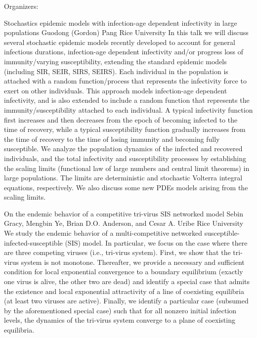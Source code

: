 \label{mini14}

\miniabs
{}
{Organizers: }
{}


\vspace{2ex}
\abs
{Stochastics epidemic models with infection-age dependent infectivity in large populations}
{Guodong (Gordon) Pang}
{Rice University}
{In this talk we will discuss several stochastic epidemic models recently developed to account for general infectious durations, infection-age dependent infectivity and/or progress loss of immunity/varying susceptibility, extending the standard epidemic models (including SIR, SEIR, SIRS, SEIRS). Each individual in the population is attached with a random function/process that represents the infectivity force to exert on other individuals. This approach models infection-age dependent infectivity, and is also extended to include a random function that represents the immunity/susceptibility attached to each individual. A typical infectivity function first increases and then decreases from the epoch of becoming infected to the time of recovery, while a typical susceptibility function gradually increases from the time of recovery to the time of losing immunity and becoming fully susceptible. We analyze the population dynamics of the infected and recovered individuals, and the total infectivity and susceptibility processes by establishing the scaling limits (functional law of large numbers and central limit theorems) in large populations. The limits are deterministic and stochastic Volterra integral equations, respectively. We also discuss some new PDEs models arising from the scaling limits.}


\vspace{1.5ex}
\abs
{On the endemic behavior of a competitive tri-virus SIS networked model}
{Sebin Gracy, Mengbin Ye, Brian D.O. Anderson, and Cesar A. Uribe}
{Rice University}
{We study the endemic behavior of a multi-competitive networked susceptible-infected-susceptible (SIS) model. In particular, we focus on the case where there are three competing viruses (i.e., tri-virus system). First, we show that the tri-virus system is not monotone. Thereafter, we provide a necessary and sufficient condition for local exponential convergence to a boundary equilibrium (exactly one virus is alive, the other two are dead) and identify a special case that admits the existence and local exponential attractivity of a line of coexisting equilibria (at least two viruses are active). Finally, we identify a particular case (subsumed by the aforementioned special case) such that for all nonzero initial infection levels, the dynamics of the tri-virus system converge to a plane of coexisting equilibria.}


